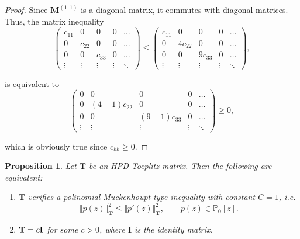 \documentclass[12pt]{amsart}
\theoremstyle{definition}
\theoremstyle{plain}
\newtheorem{prop}{Proposition}
\theoremstyle{remark}
\begin{document}
\begin{proof} Since $\mathbf{M}^{(1,1)}$ is a diagonal matrix,  it commutes with diagonal matrices. Thus,   the matrix inequality 
$$
 \begin{pmatrix}  c_{11} & 0& 0 & 0 & \dots \\  0 & c_{22}& 0 & 0 & \dots \\  0 & 0 & c_{33} & 0 & \dots \\  \vdots  & \vdots & \vdots & \vdots & \ddots \end{pmatrix} \leq  \begin{pmatrix}  c_{11} & 0& 0 & 0 & \dots \\  0 & 4c_{22}& 0 & 0 & \dots \\  0 & 0 & 9c_{33} & 0 & \dots \\  \vdots  & \vdots & \vdots & \vdots & \ddots \end{pmatrix},
$$


\noindent is equivalent to 
$$
 \begin{pmatrix}  0 & 0& 0 & 0 & \dots \\  0 & (4-1)c_{22}& 0 & 0 & \dots \\  0 & 0 & (9-1)c_{33} & 0 & \dots \\  \vdots  & \vdots & \vdots & \vdots & \ddots \end{pmatrix}
\geq 0,
$$

\noindent which is obviously true since  $c_{kk} \geq 0$. 
\end{proof} 


\begin{prop} Let $\mathbf{T}$ be an HPD   Toeplitz matrix. Then the following are equivalent:
\medskip 

\begin{enumerate} 
\item $\mathbf{T}$ verifies a polinomial Muckenhoupt-type inequality with constant $C=1$, i.e. 
$$
\Vert p(z) \Vert^{2}_{\mathbf{T}} \leq 
\Vert p'(z) \Vert^{2}_{\mathbf{T}}, \qquad p(z) \in \mathbb{P}_0[z]. $$

\medskip
\item $\mathbf{T}=c{\bf I}$ for some $c>0$, where $\mathbf{I}$ is the identity matrix. \end{enumerate}  
\end{prop} 
\end{document}
